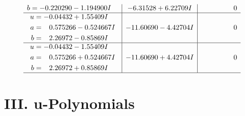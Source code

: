 \documentclass[1p]{elsarticle_modified}
\theoremstyle{definition}
\begin{document}
$$\begin{array}{c|c|c}
\begin{aligned}
b &= -0.220290 - 1.194900 I\end{aligned}
 & -6.31528 + 6.22709 I & \phantom{-0.000000 } 0 \\ \hline\begin{aligned}
u &= -0.04432 + 1.55409 I \\
a &= \phantom{-}0.575266 - 0.524667 I \\
b &= \phantom{-}2.26972 - 0.85869 I\end{aligned}
 & -11.60690 - 4.42704 I & \phantom{-0.000000 } 0 \\ \hline\begin{aligned}
u &= -0.04432 - 1.55409 I \\
a &= \phantom{-}0.575266 + 0.524667 I \\
b &= \phantom{-}2.26972 + 0.85869 I\end{aligned}
 & -11.60690 + 4.42704 I & \phantom{-0.000000 } 0\\
 \hline 
 \end{array}$$\newpage
\newpage\renewcommand{\arraystretch}{1}
\centering \section*{ III. u-Polynomials}
\end{document}
